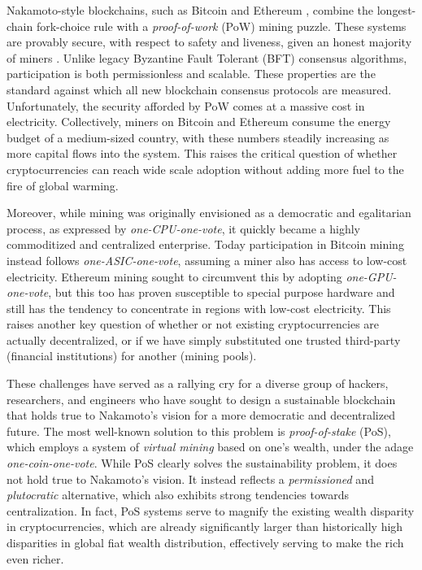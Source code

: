 \documentclass[conference]{IEEEtran}
\begin{document}
Nakamoto-style blockchains, such as Bitcoin \cite{bitcoin} and Ethereum \cite{buterin2014next,ethereum-wood}, combine the longest-chain fork-choice rule with a \textit{proof-of-work} (PoW) mining puzzle. These systems are provably secure, with respect to safety and liveness, given an honest majority of miners \cite{garay2015bitcoin}. Unlike legacy Byzantine Fault Tolerant (BFT) consensus algorithms, participation is both permissionless and scalable. These properties are the standard against which all new blockchain consensus protocols are measured. Unfortunately, the security afforded by PoW comes at a massive cost in electricity. Collectively, miners on Bitcoin and Ethereum consume the energy budget of a medium-sized country, with these numbers steadily increasing as more capital flows into the system. This raises the critical question of whether cryptocurrencies can reach wide scale adoption without adding more fuel to the fire of global warming.

Moreover, while mining was originally envisioned as a democratic and egalitarian process, as expressed by \textit{one-CPU-one-vote}, it quickly became a highly commoditized and centralized enterprise. Today participation in Bitcoin mining instead follows \textit{one-ASIC-one-vote}, assuming a miner also has access to low-cost electricity. Ethereum mining sought to circumvent this by adopting \textit{one-GPU-one-vote}, but this too has proven susceptible to special purpose hardware and still has the tendency to concentrate in regions with low-cost electricity. This raises another key question of whether or not existing cryptocurrencies are actually decentralized, or if we have simply substituted one trusted third-party (financial institutions) for another (mining pools).

These challenges have served as a rallying cry for a diverse group of hackers, researchers, and engineers who have sought to design a sustainable blockchain that holds true to Nakamoto’s vision for a more democratic and decentralized future. The most well-known solution to this problem is \textit{proof-of-stake} (PoS), which employs a system of \textit{virtual mining} based on one’s wealth, under the adage \textit{one-coin-one-vote}. While PoS clearly solves the sustainability problem, it does not hold true to Nakamoto’s vision. It instead reflects a \textit{permissioned} and \textit{plutocratic} alternative, which also exhibits strong tendencies towards centralization. In fact, PoS systems serve to magnify the existing wealth disparity in cryptocurrencies, which are already significantly larger than historically high disparities in global fiat wealth distribution, effectively serving to make the rich even richer. 
\end{document}
